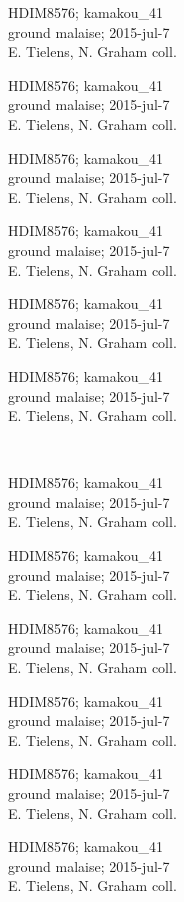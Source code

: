 \documentclass[2pt]{extarticle}
\begin{document}
\noindent
\parbox{0.16\textwidth}{\tiny \raggedright \rule[-0.3\baselineskip]{0pt}{10pt}HDIM8576; kamakou\_41\\ ground malaise; 2015-jul-7\\ E. Tielens, N. Graham coll.}
\parbox{0.16\textwidth}{\tiny \raggedright \rule[-0.3\baselineskip]{0pt}{10pt}HDIM8576; kamakou\_41\\ ground malaise; 2015-jul-7\\ E. Tielens, N. Graham coll.}
\parbox{0.16\textwidth}{\tiny \raggedright \rule[-0.3\baselineskip]{0pt}{10pt}HDIM8576; kamakou\_41\\ ground malaise; 2015-jul-7\\ E. Tielens, N. Graham coll.}
\parbox{0.16\textwidth}{\tiny \raggedright \rule[-0.3\baselineskip]{0pt}{10pt}HDIM8576; kamakou\_41\\ ground malaise; 2015-jul-7\\ E. Tielens, N. Graham coll.}
\parbox{0.16\textwidth}{\tiny \raggedright \rule[-0.3\baselineskip]{0pt}{10pt}HDIM8576; kamakou\_41\\ ground malaise; 2015-jul-7\\ E. Tielens, N. Graham coll.}
\parbox{0.16\textwidth}{\tiny \raggedright \rule[-0.3\baselineskip]{0pt}{10pt}HDIM8576; kamakou\_41\\ ground malaise; 2015-jul-7\\ E. Tielens, N. Graham coll.} \\ 
\vspace{0.001in} 

\noindent
\parbox{0.16\textwidth}{\tiny \raggedright \rule[-0.3\baselineskip]{0pt}{10pt}HDIM8576; kamakou\_41\\ ground malaise; 2015-jul-7\\ E. Tielens, N. Graham coll.}
\parbox{0.16\textwidth}{\tiny \raggedright \rule[-0.3\baselineskip]{0pt}{10pt}HDIM8576; kamakou\_41\\ ground malaise; 2015-jul-7\\ E. Tielens, N. Graham coll.}
\parbox{0.16\textwidth}{\tiny \raggedright \rule[-0.3\baselineskip]{0pt}{10pt}HDIM8576; kamakou\_41\\ ground malaise; 2015-jul-7\\ E. Tielens, N. Graham coll.}
\parbox{0.16\textwidth}{\tiny \raggedright \rule[-0.3\baselineskip]{0pt}{10pt}HDIM8576; kamakou\_41\\ ground malaise; 2015-jul-7\\ E. Tielens, N. Graham coll.}
\parbox{0.16\textwidth}{\tiny \raggedright \rule[-0.3\baselineskip]{0pt}{10pt}HDIM8576; kamakou\_41\\ ground malaise; 2015-jul-7\\ E. Tielens, N. Graham coll.}
\parbox{0.16\textwidth}{\tiny \raggedright \rule[-0.3\baselineskip]{0pt}{10pt}HDIM8576; kamakou\_41\\ ground malaise; 2015-jul-7\\ E. Tielens, N. Graham coll.} \\ 
\vspace{0.001in} 
\end{document}
